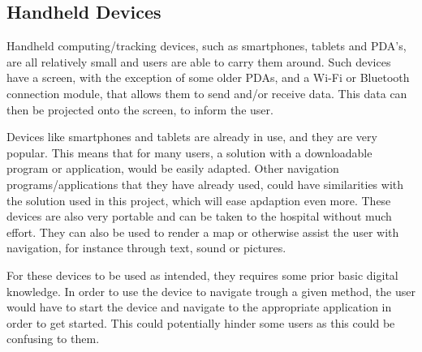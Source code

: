  	 
 	 

\subsection{Handheld Devices} %
\label{sub:device}

 	 
Handheld computing/tracking devices, such as smartphones, tablets and PDA's, are all relatively small and users are able to carry them around. Such devices have a screen, with the exception of some older PDAs, and a Wi-Fi or Bluetooth connection module, that allows them to send and/or receive data. This data can then be projected onto the screen, to inform the user.

Devices like smartphones and tablets are already in use, and they are very popular. This means that for many users, a solution with a downloadable program or application, would be easily adapted. Other navigation programs/applications that they have already used, could have similarities with the solution used in this project, which will ease apdaption even more. These devices are also very portable and can be taken to the hospital without much effort. They can also be used to render a map or otherwise assist the user with navigation, for instance through text, sound or pictures.

For these devices to be used as intended, they requires some prior basic digital knowledge. In order to use the device to navigate trough a given method, the user would have to start the device and navigate to the appropriate application in order to get started. This could potentially hinder some users as this could be confusing to them.

